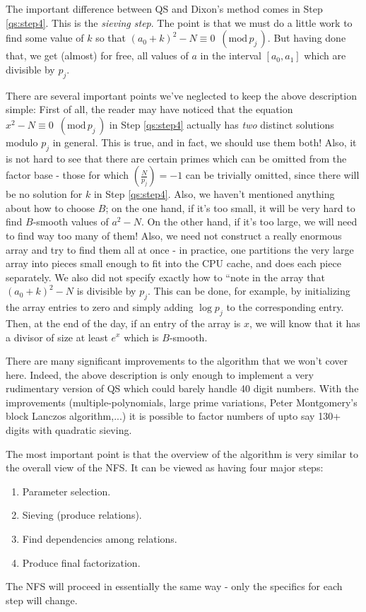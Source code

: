 \documentclass[12pt]{article}
\newcommand{\md}[1]{\,\,\, ( \mathrm{mod}\, #1 \,) }
\begin{document}
  The important difference between QS and Dixon's method comes in Step
  \ref{qs:step4}. This is the {\em sieving step}. The point is that
  we must do a little work to find some value of $k$ so that
  $(a_0 + k)^2 - N \equiv 0 \md{p_j}$. But having done that, we get
  (almost) for free, all values of $a$ in the interval $[a_0, a_1]$
  which are divisible by $p_j$.

  There are several important points we've neglected to keep the above
  description simple: First of all, the reader may have noticed that
  the equation $x^2 - N\equiv 0\md{p_j}$ in Step \ref{qs:step4} actually
  has {\em two} distinct solutions modulo $p_j$ in general. This is
  true, and in fact, we should use them both! Also, it is not hard to
  see that there are certain primes which can be omitted from the
  factor base - those for which $\left(\frac{N}{p_j}\right)=-1$ can
  be trivially omitted, since there will be no solution for $k$ in
  Step \ref{qs:step4}. Also, we haven't mentioned anything about how
  to choose $B$; on the one hand, if it's too small, it will be very
  hard to find $B$-smooth values of $a^2-N$. On the other hand, if it's
  too large, we will need to find way too many of them! Also, we need
  not construct a really enormous array and try to find them all at once -
  in practice, one partitions the very large array into pieces small
  enough to fit into the CPU cache, and does each piece separately.
  We also did not specify exactly how to ``note in the array that
  $(a_0 +k)^2 - N$ is divisible by $p_j$. This can be done, for example, by
  initializing the array entries to zero and simply adding $\log p_j$
  to the corresponding entry. Then, at the end of the day, if an entry
  of the array is $x$, we will know that it has a divisor of size at least
  $e^x$ which is $B$-smooth.

  There are many significant improvements to the algorithm that we won't
  cover here. Indeed, the above description is only enough to implement
  a very rudimentary version of QS which could barely handle 40 digit
  numbers. With the improvements (multiple-polynomials, large prime variations,
  Peter Montgomery's block Lanczos algorithm,...) it is possible to factor 
  numbers of upto say 130+ digits with quadratic sieving.  

  The most important point is that the overview of the algorithm is
  very similar to the overall view of the NFS. It can be viewed as having
  four major steps:
  \begin{enumerate}
    \item
      Parameter selection.
    \item
      Sieving (produce relations).
    \item
      Find dependencies among relations.
    \item
      Produce final factorization.
  \end{enumerate}
  The NFS will proceed in essentially the same way - only the specifics for
  each step will change.
\end{document}
